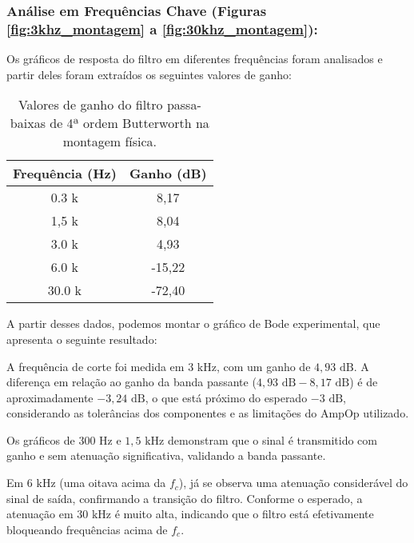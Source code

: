 \subsubsection{Análise em Frequências Chave (Figuras \ref{fig:3khz_montagem} a \ref{fig:30khz_montagem}):}
Os gráficos de resposta do filtro em diferentes frequências foram analisados e partir deles foram extraídos os seguintes valores de ganho:

\begin{table}[H]
\centering
\begin{tabular}{|c|c|}
\hline
\textbf{Frequência (Hz)} & \textbf{Ganho (dB)} \\
\hline
0.3 k & 8,17 \\ \hline
1,5 k & 8,04 \\ \hline
3.0 k & 4,93 \\ \hline
6.0 k & -15,22 \\ \hline
30.0 k & -72,40 \\ \hline
\end{tabular}
\caption{Valores de ganho do filtro passa-baixas de 4ª ordem Butterworth na montagem física.}
\label{tab:ganho_montagem}
\end{table}

A partir desses dados, podemos montar o gráfico de Bode experimental, que apresenta o seguinte resultado:


A frequência de corte foi medida em $3 \text{ kHz}$, com um ganho de $4,93 \text{ dB}$. A diferença em relação ao ganho da banda passante ($4,93 \text{ dB} - 8,17 \text{ dB}$) é de aproximadamente $-3,24 \text{ dB}$, o que está próximo do esperado $-3 \text{ dB}$, considerando as tolerâncias dos componentes e as limitações do AmpOp utilizado.

Os gráficos de $300 \text{ Hz}$ e $1,5 \text{ kHz}$ demonstram que o sinal é transmitido com ganho e sem atenuação significativa, validando a banda passante.

Em $6 \text{ kHz}$ (uma oitava acima da $f_c$), já se observa uma atenuação considerável do sinal de saída, confirmando a transição do filtro. Conforme o esperado, a atenuação em $30 \text{ kHz}$ é muito alta, indicando que o filtro está efetivamente bloqueando frequências acima de $f_c$.

